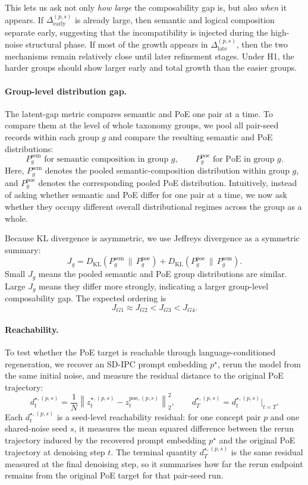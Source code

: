 This lets us ask not only \emph{how large} the composability gap is, but also \emph{when} it appears. If \(\Delta_{\mathrm{early}}^{(p,s)}\) is already large, then semantic and logical composition separate early, suggesting that the incompatibility is injected during the high-noise structural phase. If most of the growth appears in \(\Delta_{\mathrm{late}}^{(p,s)}\), then the two mechanisms remain relatively close until later refinement stages. Under H1, the harder groups should show larger early and total growth than the easier groups.

\paragraph{Group-level distribution gap.}
The latent-gap metric compares semantic and PoE one pair at a time. To compare them at the level of whole taxonomy groups, we pool all pair-seed records within each group \(g\) and compare the resulting semantic and PoE distributions:
\[
P_g^{\mathrm{sem}} \text{ for semantic composition in group } g,
\qquad
P_g^{\mathrm{poe}} \text{ for PoE in group } g.
\]
Here, \(P_g^{\mathrm{sem}}\) denotes the pooled semantic-composition distribution within group \(g\), and \(P_g^{\mathrm{poe}}\) denotes the corresponding pooled PoE distribution. Intuitively, instead of asking whether semantic and PoE differ for one pair at a time, we now ask whether they occupy different overall distributional regimes across the group as a whole.

Because KL divergence is asymmetric, we use Jeffreys divergence as a symmetric summary:
\[
J_g
=
D_{\mathrm{KL}}\!\left(P_g^{\mathrm{sem}} \,\|\, P_g^{\mathrm{poe}}\right)
+
D_{\mathrm{KL}}\!\left(P_g^{\mathrm{poe}} \,\|\, P_g^{\mathrm{sem}}\right).
\]
Small \(J_g\) means the pooled semantic and PoE group distributions are similar. Large \(J_g\) means they differ more strongly, indicating a larger group-level composability gap. The expected ordering is
\[
J_{G1}\approx J_{G2}<J_{G3}<J_{G4}.
\]

\paragraph{Reachability.}
To test whether the PoE target is reachable through language-conditioned regeneration, we recover an SD-IPC prompt embedding \(p^\star\), rerun the model from the same initial noise, and measure the residual distance to the original PoE trajectory:
\[
d_t^{\star,(p,s)}=\frac{1}{N}\left\|z_t^{\star,(p,s)}-z_t^{\mathrm{poe},(p,s)}\right\|_2^2,
\qquad
d_T^{\star,(p,s)}=d_t^{\star,(p,s)}\big|_{t=T}.
\]
Each \(d_t^{\star,(p,s)}\) is a seed-level reachability residual: for one concept pair \(p\) and one shared-noise seed \(s\), it measures the mean squared difference between the rerun trajectory induced by the recovered prompt embedding \(p^\star\) and the original PoE trajectory at denoising step \(t\). 
The terminal quantity \(d_T^{\star,(p,s)}\) is the same residual measured at the final denoising step, so it summarises how far the rerun endpoint remains from the original PoE target for that pair-seed run.

